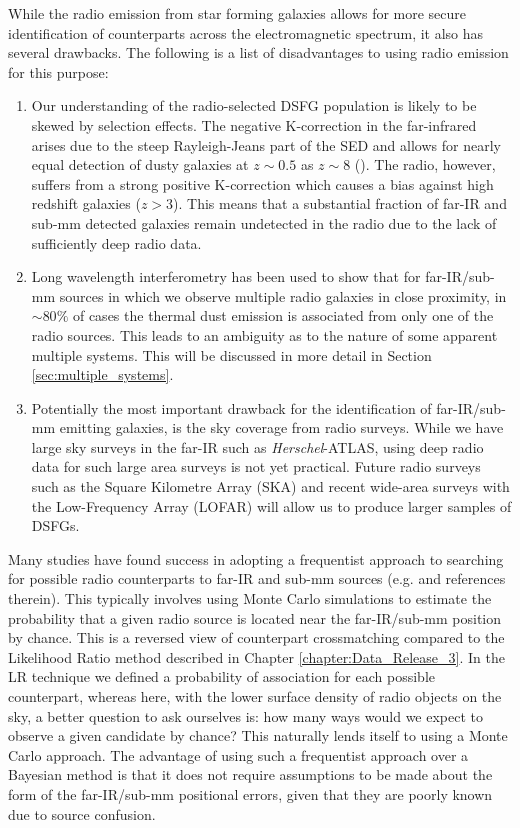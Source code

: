 While the radio emission from star forming galaxies allows for more secure identification of counterparts across the electromagnetic spectrum, it also has several drawbacks. The following is a list of disadvantages to using radio emission for this purpose:

\begin{enumerate}
    \item Our understanding of the radio-selected DSFG population is likely to be skewed by selection effects. The negative K-correction in the far-infrared arises due to the steep Rayleigh-Jeans part of the SED and allows for nearly equal detection of dusty galaxies at $z \sim 0.5$ as $z \sim 8$ (\citealt{Blain_2002}). The radio, however, suffers from a strong positive K-correction which causes a bias against high redshift galaxies ($z > 3$). This means that a substantial fraction of far-IR and sub-mm detected galaxies remain undetected in the radio due to the lack of sufficiently deep radio data.
    \item Long wavelength interferometry has been used to show that for far-IR/sub-mm sources in which we observe multiple radio galaxies in close proximity, in $\sim 80\%$ of cases the thermal dust emission is associated from only one of the radio sources. This leads to an ambiguity as to the nature of some apparent multiple systems. This will be discussed in more detail in Section \ref{sec:multiple_systems}.
    \item Potentially the most important drawback for the identification of far-IR/sub-mm emitting galaxies, is the sky coverage from radio surveys. While we have large sky surveys in the far-IR such as \textit{Herschel}-ATLAS, using deep radio data for such large area surveys is not yet practical. Future radio surveys such as the Square Kilometre Array (SKA) and recent wide-area surveys with the Low-Frequency Array (LOFAR) will allow us to produce larger samples of DSFGs.
\end{enumerate}

Many studies have found success in adopting a frequentist approach to searching for possible radio counterparts to far-IR and sub-mm sources (e.g. \citealt{Eales_2009, Dye_2009, Dunlop_2010} and references therein). This typically involves using Monte Carlo simulations to estimate the probability that a given radio source is located near the far-IR/sub-mm position by chance. This is a reversed view of counterpart crossmatching compared to the Likelihood Ratio method described in Chapter \ref{chapter:Data_Release_3}. In the LR technique we defined a probability of association for each possible counterpart, whereas here, with the lower surface density of radio objects on the sky, a better question to ask ourselves is: how many ways would we expect to observe a given candidate by chance? This naturally lends itself to using a Monte Carlo approach. The advantage of using such a frequentist approach over a Bayesian method is that it does not require assumptions to be made about the form of the far-IR/sub-mm positional errors, given that they are poorly known due to source confusion.

